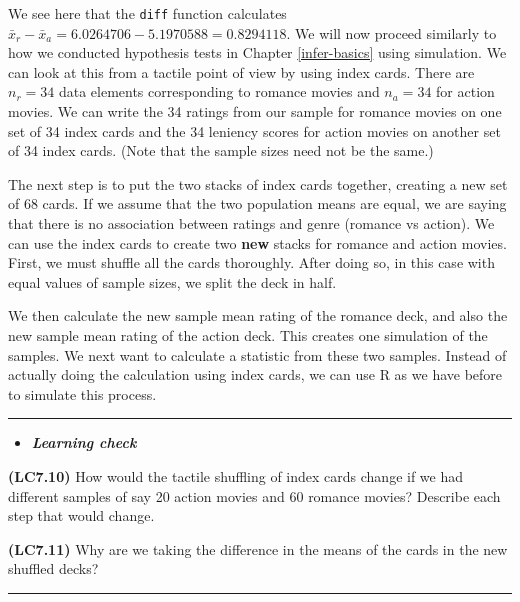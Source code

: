 \documentclass[]{tufte-book}
\newenvironment{Shaded}{\begin{snugshade}}{\end{snugshade}}
\newcommand{\KeywordTok}[1]{\textcolor[rgb]{0.13,0.29,0.53}{\textbf{{#1}}}}
\newcommand{\DataTypeTok}[1]{\textcolor[rgb]{0.13,0.29,0.53}{{#1}}}
\newcommand{\StringTok}[1]{\textcolor[rgb]{0.31,0.60,0.02}{{#1}}}
\newcommand{\NormalTok}[1]{{#1}}
\newenvironment{rmdblock}[1]
  {\begin{shaded*}
  \begin{itemize}
  \renewcommand{\labelitemi}{
    \raisebox{-.7\height}[0pt][0pt]{
    }
  }
  \item
  }
  {
  \end{itemize}
  \end{shaded*}
  }
\newenvironment{learncheck}
  {\begin{rmdblock}{warning}}
  {\end{rmdblock}}
\begin{document}
We see here that the \texttt{diff} function calculates
\(\bar{x}_r - \bar{x}_a = 6.0264706 - 5.1970588 = 0.8294118\). We will
now proceed similarly to how we conducted hypothesis tests in Chapter
\ref{infer-basics} using simulation. We can look at this from a tactile
point of view by using index cards. There are \(n_r = 34\) data elements
corresponding to romance movies and \(n_a = 34\) for action movies. We
can write the 34 ratings from our sample for romance movies on one set
of 34 index cards and the 34 leniency scores for action movies on
another set of 34 index cards. (Note that the sample sizes need not be
the same.)

The next step is to put the two stacks of index cards together, creating
a new set of 68 cards. If we assume that the two population means are
equal, we are saying that there is no association between ratings and
genre (romance vs action). We can use the index cards to create two
\textbf{new} stacks for romance and action movies. First, we must
shuffle all the cards thoroughly. After doing so, in this case with
equal values of sample sizes, we split the deck in half.

We then calculate the new sample mean rating of the romance deck, and
also the new sample mean rating of the action deck. This creates one
simulation of the samples. We next want to calculate a statistic from
these two samples. Instead of actually doing the calculation using index
cards, we can use R as we have before to simulate this process.

\begin{center}\rule{\linewidth}{\linethickness}\end{center}\begin{learncheck}
\textbf{\emph{Learning check}}
\end{learncheck}

\textbf{(LC7.10)} How would the tactile shuffling of index cards change
if we had different samples of say 20 action movies and 60 romance
movies? Describe each step that would change.

\textbf{(LC7.11)} Why are we taking the difference in the means of the
cards in the new shuffled decks?

\begin{center}\rule{\linewidth}{\linethickness}\end{center}

\begin{Shaded}
\end{Shaded}
\end{document}
